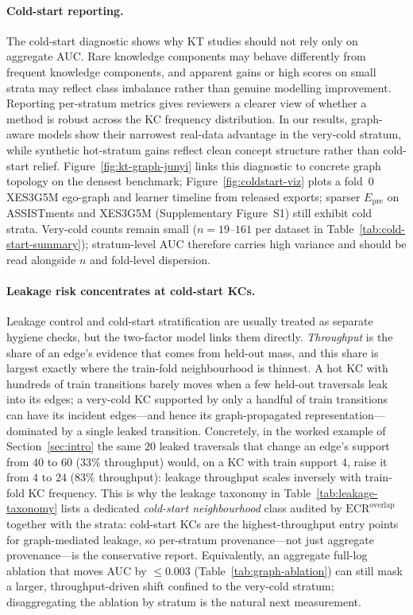 \documentclass[pdflatex,sn-mathphys-num]{sn-jnl}
\newcommand{\Epre}{\ensuremath{E_{\text{pre}}}}
\newcommand{\KCs}{knowledge components}
\begin{document}
\paragraph{Cold-start reporting.}
The cold-start diagnostic shows why KT studies should not rely only on
aggregate AUC. Rare \KCs{} may behave differently from frequent
\KCs{}, and apparent gains or high scores on small strata may reflect
class imbalance rather than genuine modelling improvement. Reporting
per-stratum metrics gives reviewers a clearer view of whether a method
is robust across the KC frequency distribution. In our results,
graph-aware models show their narrowest real-data advantage in the
very-cold stratum, while synthetic hot-stratum gains reflect clean
concept structure rather than cold-start relief.
Figure~\ref{fig:kt-graph-junyi} links this diagnostic to concrete graph
topology on the densest benchmark; Figure~\ref{fig:coldstart-viz} plots a
fold~0 XES3G5M ego-graph and learner timeline from released exports; sparser
$\Epre$ on ASSISTments and XES3G5M (Supplementary Figure~S1) still exhibit
cold strata. Very-cold counts remain small ($n{=}19$--$161$ per dataset in
Table~\ref{tab:cold-start-summary}); stratum-level AUC therefore carries high
variance and should be read alongside $n$ and fold-level dispersion.

\paragraph{Leakage risk concentrates at cold-start KCs.}
Leakage control and cold-start stratification are usually treated as separate
hygiene checks, but the two-factor model links them directly. \emph{Throughput}
is the share of an edge's evidence that comes from held-out mass, and this share
is largest exactly where the train-fold neighbourhood is thinnest. A hot KC with
hundreds of train transitions barely moves when a few held-out traversals leak
into its edges; a very-cold KC supported by only a handful of train transitions
can have its incident edges---and hence its graph-propagated representation---
dominated by a single leaked transition. Concretely, in the worked example of
Section~\ref{sec:intro} the same $20$ leaked traversals that change an edge's
support from $40$ to $60$ ($33\%$ throughput) would, on a KC with train support
$4$, raise it from $4$ to $24$ ($83\%$ throughput): leakage throughput scales
inversely with train-fold KC frequency. This is why the leakage taxonomy in
Table~\ref{tab:leakage-taxonomy} lists a dedicated \emph{cold-start
neighbourhood} class audited by $\mathrm{ECR}^{\mathrm{overlap}}$ together with
the strata: cold-start KCs are the highest-throughput entry points for
graph-mediated leakage, so per-stratum provenance---not just aggregate
provenance---is the conservative report. Equivalently, an aggregate full-log
ablation that moves AUC by ${\leq}0.003$ (Table~\ref{tab:graph-ablation}) can
still mask a larger, throughput-driven shift confined to the very-cold stratum;
disaggregating the ablation by stratum is the natural next measurement.
\end{document}
